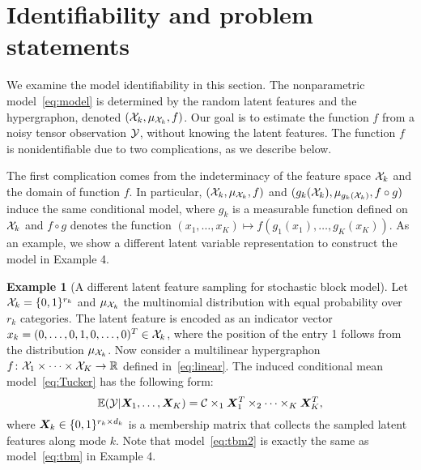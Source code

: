 \documentclass{article}
\theoremstyle{plain}
\theoremstyle{definition}
\newtheorem{exam}{Example}
\begin{document}
\section{Identifiability and problem statements}
We examine the model identifiability in this section. The nonparametric model~\eqref{eq:model} is determined by the random latent features and the hypergraphon, denoted $(\mathcal{X}_k, \mu_{\mathcal{X}_k},f)$. Our goal is to estimate the function $f$ from a noisy tensor observation $\mathcal{Y}$, without knowing the latent features. The function $f$ is nonidentifiable due to two complications, as we describe below. 

The first complication comes from the indeterminacy of the feature space $\mathcal{X}_k$ and the domain of function $f$. In particular, $(\mathcal{X}_k,\mu_{\mathcal{X}_k}, f)$ and $(g_k(\mathcal{X}_k), \mu_{g_k(\mathcal{X}_k)}, f\circ g)$ induce the same conditional model, where $g_k$ is a measurable function defined on $\mathcal{X}_k$ and $f\circ g$ denotes the function $(x_1,\ldots,x_K) \mapsto f(g_1(x_1),\ldots,g_K(x_K))$. As an example, we show a different latent variable representation to construct the model in Example 4. 

\begin{exam}[A different latent feature sampling for stochastic block model] Let $\mathcal{X}_k=\{0,1\}^{r_k}$ and $\mu_{\mathcal{X}_k}$ the multinomial distribution with equal probability over $r_k$ categories. The latent feature is encoded as an indicator vector $x_k=(0,\ldots,0,1,0,\ldots,0)^T\in \mathcal{X}_k$, where the position of the entry 1 follows from the distribution $\mu_{\mathcal{X}_k}$. Now consider a multilinear hypergraphon $f\colon \mathcal{X}_1\times \cdots \times \mathcal{X}_K\to \mathbb{R}$ defined in~\eqref{eq:linear}. The induced conditional mean model~\eqref{eq:Tucker} has the following form:
\begin{equation}\label{eq:tbm2}
\mathbb{E}(\mathcal{Y}|\bm X_1,\ldots,\bm X_K)=\mathcal{C}\times_1\bm X^T_1\times_2\cdots \times_K\bm X^T_K,
\end{equation}
where $\bm X_k\in\{0,1\}^{r_k\times d_k}$ is a membership matrix that collects the sampled latent features along mode $k$. Note that model~\eqref{eq:tbm2} is exactly the same as model~\eqref{eq:tbm} in Example 4. 
\end{exam}
\end{document}
